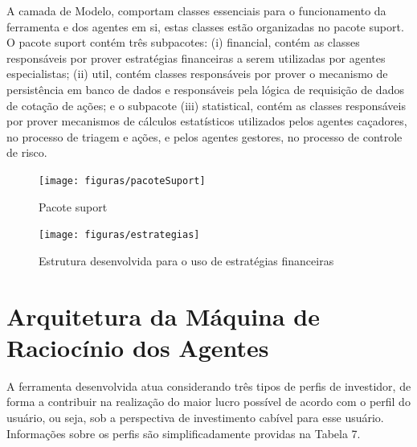 A camada de Modelo, comportam classes  essenciais para o funcionamento da ferramenta e dos agentes em si, estas classes estão organizadas no pacote suport. O pacote suport contém três subpacotes: (i) financial, contém as classes responsáveis por prover estratégias financeiras a serem utilizadas por agentes especialistas; (ii) util, contém classes responsáveis por prover o mecanismo de persistência em banco de dados e responsáveis pela lógica de requisição de dados de cotação de ações; e o subpacote (iii) statistical, contém as classes responsáveis por prover mecanismos de cálculos estatísticos utilizados pelos agentes caçadores, no processo de triagem e ações, e pelos agentes gestores, no processo de controle de risco.   

\begin{figure}[h]
\centering
\label{f23}
\texttt{[image: figuras/pacoteSuport]}
\caption{Pacote suport}
\end{figure}


\begin{figure}[h]
\centering
\label{f24}
\texttt{[image: figuras/estrategias]}
\caption{Estrutura desenvolvida para o uso de estratégias financeiras}
\end{figure}
\FloatBarrier

\section{Arquitetura da Máquina de Raciocínio dos Agentes}

A ferramenta desenvolvida atua considerando três tipos de perfis de investidor, de forma a contribuir na realização do maior lucro possível de acordo com o perfil do usuário, ou seja, sob a perspectiva de investimento cabível para esse usuário. Informações sobre os perfis são simplificadamente providas na Tabela 7.

